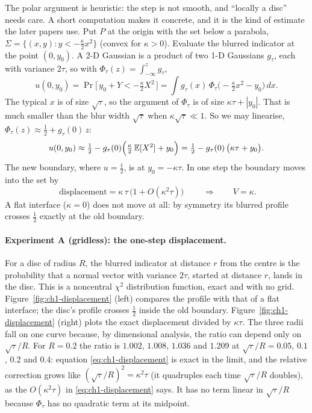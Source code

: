 The polar argument is heuristic: the step is not smooth, and ``locally a disc''
needs care. A short computation makes it concrete, and it is the kind of
estimate the later papers use. Put $P$ at the origin with the set below a
parabola, $\Sigma = \{(x, y) : y < -\tfrac{\kappa}{2}x^2\}$ (convex for
$\kappa > 0$). Evaluate the blurred indicator at the point $(0, y_0)$. A 2-D
Gaussian is a product of two 1-D Gaussians $g_\tau$, each with variance $2\tau$,
so with $\Phi_\tau(z) = \int_{-\infty}^z g_\tau$,
\[
  u(0, y_0) = \Pr\bigl[\,y_0 + Y < -\tfrac{\kappa}{2} X^2\,\bigr]
            = \int g_\tau(x)\, \Phi_\tau\!\bigl(-\tfrac{\kappa}{2}x^2 - y_0\bigr)\, dx .
\]
The typical $x$ is of size $\sqrt\tau$, so the argument of $\Phi_\tau$ is of
size $\kappa\tau + |y_0|$. That is much smaller than the blur width $\sqrt\tau$
when $\kappa\sqrt\tau \ll 1$. So we may linearise,
$\Phi_\tau(z) \approx \tfrac12 + g_\tau(0)\, z$:
\[
  u(0, y_0) \approx \tfrac12 - g_\tau(0)\Bigl(\tfrac{\kappa}{2}\,\mathbb E[X^2] + y_0\Bigr)
            = \tfrac12 - g_\tau(0)\,\bigl(\kappa\tau + y_0\bigr).
\]
The new boundary, where $u = \tfrac12$, is at $y_0 = -\kappa\tau$. In one step the
boundary moves into the set by
\begin{equation}
  \boxed{\;\text{displacement} = \kappa\,\tau\,\bigl(1 + O(\kappa^2 \tau)\bigr)\;}
  \qquad\Longrightarrow\qquad V = \kappa .
  \label{eq:ch1-displacement}
\end{equation}
A flat interface ($\kappa = 0$) does not move at all: by symmetry its blurred
profile crosses $\tfrac12$ exactly at the old boundary.

\paragraph{Experiment A (gridless): the one-step displacement.}
For a disc of radius $R$, the blurred indicator at distance $r$ from the centre is
the probability that a normal vector with variance $2\tau$, started at distance
$r$, lands in the disc. This is a noncentral $\chi^2$ distribution function,
exact and with no grid. Figure~\ref{fig:ch1-displacement} (left) compares the
profile with that of a flat interface; the disc's profile crosses $\tfrac12$
inside the old boundary. Figure~\ref{fig:ch1-displacement} (right) plots the
exact displacement divided by $\kappa\tau$. The three radii fall on one curve
because, by dimensional analysis, the ratio can depend only on
$\sqrt\tau/R$. For $R = 0.2$ the ratio is $1.002$, $1.008$, $1.036$ and $1.209$ at
$\sqrt\tau/R = 0.05$, $0.1$, $0.2$ and $0.4$: equation
\eqref{eq:ch1-displacement} is exact in the limit, and the relative correction grows like
$(\sqrt\tau/R)^2 = \kappa^2\tau$ (it quadruples each time $\sqrt\tau/R$ doubles), as the
$O(\kappa^2\tau)$ in \eqref{eq:ch1-displacement} says. It has no term linear in
$\sqrt\tau/R$ because $\Phi_\tau$ has no quadratic term at its midpoint.

